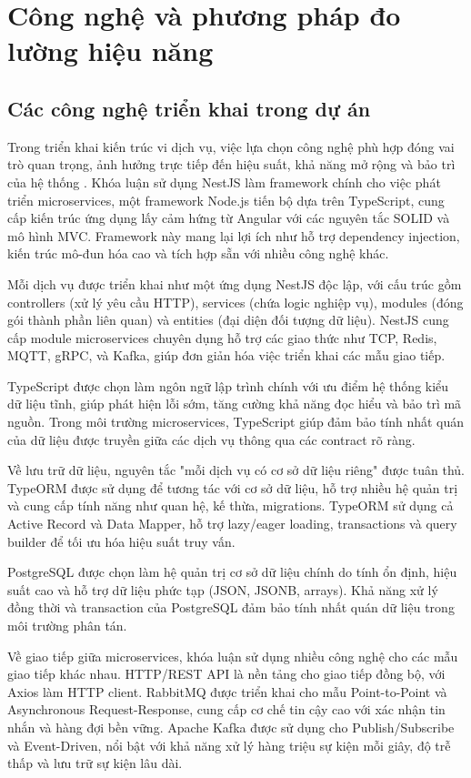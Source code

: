 \section{Công nghệ và phương pháp đo lường hiệu năng}

\subsection{Các công nghệ triển khai trong dự án}
Trong triển khai kiến trúc vi dịch vụ, việc lựa chọn công nghệ phù hợp đóng vai trò quan trọng, ảnh hưởng trực tiếp đến hiệu suất, khả năng mở rộng và bảo trì của hệ thống \cite{newman2015}. Khóa luận sử dụng NestJS làm framework chính cho việc phát triển microservices, một framework Node.js tiến bộ dựa trên TypeScript, cung cấp kiến trúc ứng dụng lấy cảm hứng từ Angular với các nguyên tắc SOLID và mô hình MVC. Framework này mang lại lợi ích như hỗ trợ dependency injection, kiến trúc mô-đun hóa cao và tích hợp sẵn với nhiều công nghệ khác.

Mỗi dịch vụ được triển khai như một ứng dụng NestJS độc lập, với cấu trúc gồm controllers (xử lý yêu cầu HTTP), services (chứa logic nghiệp vụ), modules (đóng gói thành phần liên quan) và entities (đại diện đối tượng dữ liệu). NestJS cung cấp module microservices chuyên dụng hỗ trợ các giao thức như TCP, Redis, MQTT, gRPC, và Kafka, giúp đơn giản hóa việc triển khai các mẫu giao tiếp.

TypeScript được chọn làm ngôn ngữ lập trình chính với ưu điểm hệ thống kiểu dữ liệu tĩnh, giúp phát hiện lỗi sớm, tăng cường khả năng đọc hiểu và bảo trì mã nguồn. Trong môi trường microservices, TypeScript giúp đảm bảo tính nhất quán của dữ liệu được truyền giữa các dịch vụ thông qua các contract rõ ràng.

Về lưu trữ dữ liệu, nguyên tắc "mỗi dịch vụ có cơ sở dữ liệu riêng" được tuân thủ. TypeORM được sử dụng để tương tác với cơ sở dữ liệu, hỗ trợ nhiều hệ quản trị và cung cấp tính năng như quan hệ, kế thừa, migrations. TypeORM sử dụng cả Active Record và Data Mapper, hỗ trợ lazy/eager loading, transactions và query builder để tối ưu hóa hiệu suất truy vấn.

PostgreSQL được chọn làm hệ quản trị cơ sở dữ liệu chính do tính ổn định, hiệu suất cao và hỗ trợ dữ liệu phức tạp (JSON, JSONB, arrays). Khả năng xử lý đồng thời và transaction của PostgreSQL đảm bảo tính nhất quán dữ liệu trong môi trường phân tán.

Về giao tiếp giữa microservices, khóa luận sử dụng nhiều công nghệ cho các mẫu giao tiếp khác nhau. HTTP/REST API là nền tảng cho giao tiếp đồng bộ, với Axios làm HTTP client. RabbitMQ được triển khai cho mẫu Point-to-Point và Asynchronous Request-Response, cung cấp cơ chế tin cậy cao với xác nhận tin nhắn và hàng đợi bền vững. Apache Kafka được sử dụng cho Publish/Subscribe và Event-Driven, nổi bật với khả năng xử lý hàng triệu sự kiện mỗi giây, độ trễ thấp và lưu trữ sự kiện lâu dài.

